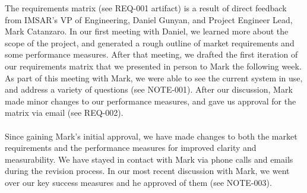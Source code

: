 
The requirements matrix (see REQ-001 artifact) is a result of direct feedback from IMSAR's VP of Engineering, Daniel Gunyan, and Project Engineer Lead, Mark Catanzaro. In our first meeting with Daniel, we learned more about the scope of the project, and generated a rough outline of market requirements and some performance measures.  After that meeting, we drafted the first iteration of our requirements matrix that we presented in person to Mark the following week.  As part of this meeting with Mark, we were able to see the current system in use, and address a variety of questions (see NOTE-001). After our discussion, Mark made minor changes to our performance measures, and gave us approval for the matrix via email (see REQ-002).
~\\~\\
Since gaining Mark's initial approval, we have made changes to both the market requirements and the performance measures for improved clarity and measurability. We have stayed in contact with Mark via phone calls and emails during the revision process. In our most recent discussion with Mark, we went over our key success measures and he approved of them (see NOTE-003).\\
